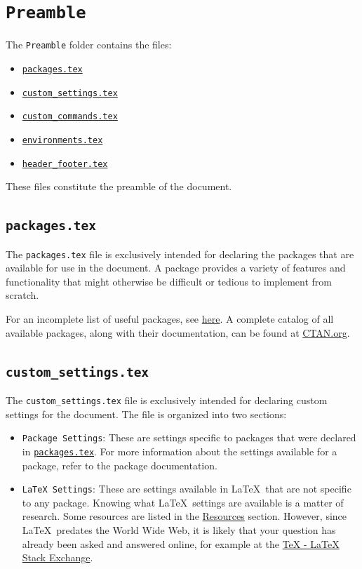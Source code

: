 \section{\texttt{Preamble}}
\label{sec:preamble}

The \texttt{Preamble} folder contains the files:
\begin{itemize}
    \item \hyperref[sec:packages.tex]{\texttt{packages.tex}}
    \item \hyperref[sec:custom_settings.tex]{\texttt{custom\_settings.tex}}
    \item \hyperref[sec:custom_commands.tex]{\texttt{custom\_commands.tex}}
    \item \hyperref[sec:environments.tex]{\texttt{environments.tex}}
    \item \hyperref[sec:header_footer.tex]{\texttt{header\_footer.tex}}
\end{itemize}
These files constitute the preamble of the document. 

\subsection{\texttt{packages.tex}}
\label{sec:packages.tex}

The \texttt{packages.tex} file is exclusively intended for declaring the packages that are available for use in the document. A package provides a variety of features and functionality that might otherwise be difficult or tedious to implement from scratch.

For an incomplete list of useful packages, see \href{https://en.wikibooks.org/wiki/LaTeX/Package_Reference}{here}. A complete catalog of all available packages, along with their documentation, can be found at \href{https://ctan.org/pkg}{CTAN.org}.

\subsection{\texttt{custom\_settings.tex}}
\label{sec:custom_settings.tex}

The \texttt{custom\_settings.tex} file is exclusively intended for declaring custom settings for the document. The file is organized into two sections:
\begin{itemize}
    \item \texttt{Package Settings}: These are settings specific to packages that were declared in \hyperref[sec:packages.tex]{\texttt{packages.tex}}. For more information about the settings available for a package, refer to the package documentation.
    \item \texttt{LaTeX Settings}: These are settings available in \LaTeX\ that are not specific to any package. Knowing what \LaTeX\ settings are available is a matter of research. Some resources are listed in the \hyperref[sec:resources]{Resources} section. However, since \LaTeX\ predates the World Wide Web, it is likely that your question has already been asked and answered online, for example at the \href{https://tex.stackexchange.com/}{TeX - LaTeX Stack Exchange}.
\end{itemize} 

